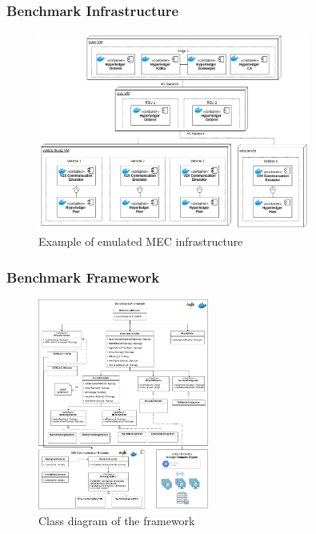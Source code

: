 \documentclass{beamer}
\begin{document}
	\begin{frame}
		\frametitle{Benchmark Infrastructure}
		\begin{figure}
			\centering
			\includegraphics[width=0.8\textwidth]{figures/experiment_deployment_diagram.png}
			\caption{Example of emulated \gls{MEC} infrastructure}
			\label{fig:emulated_mec_infrastructure}
		\end{figure}
	\end{frame}

	\begin{frame}
		\frametitle{Benchmark Framework}
		\begin{figure}
			\centering
			\includegraphics[width=0.5\textwidth]{figures/benchmarks_framework_classes.png}
			\vspace{-0.5cm}
			\caption{Class diagram of the framework}
			\label{fig:benchmark_framework_class}
		\end{figure}
	\end{frame}
\end{document}
